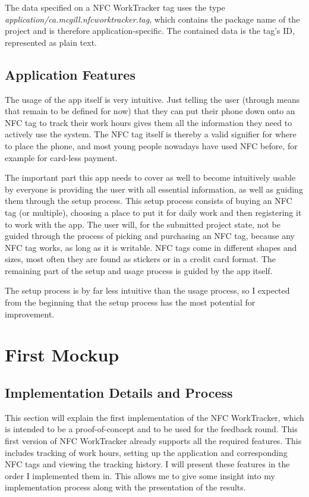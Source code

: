 \documentclass[conference]{IEEEtran}
\newcommand{\projectname}{NFC WorkTracker}
\begin{document}
The data specified on a \projectname{} tag uses the type \textit{application/ca.mcgill.nfcworktracker.tag}, which contains the package name of the project and is therefore application-specific. The contained data is the tag's ID, represented as plain text.

\subsection{Application Features}
The usage of the app itself is very intuitive. Just telling the user (through means that remain to be defined for now) that they can put their phone down onto an NFC tag to track their work hours gives them all the information they need to actively use the system. The NFC tag itself is thereby a valid signifier for where to place the phone, and most young people nowadays have used NFC before, for example for card-less payment.

The important part this app needs to cover as well to become intuitively usable by everyone is providing the user with all essential information, as well as guiding them through the setup process. This setup process consists of buying an NFC tag (or multiple), choosing a place to put it for daily work and then registering it to work with the app.
The user will, for the submitted project state, not be guided through the process of picking and purchasing an NFC tag, because any NFC tag works, as long as it is writable. NFC tags come in different shapes and sizes, most often they are found as stickers or in a credit card format. The remaining part of the setup and usage process is guided by the app itself.

The setup process is by far less intuitive than the usage process, so I expected from the beginning that the setup process has the most potential for improvement.

\section{First Mockup}
\subsection{Implementation Details and Process}
This section will explain the first implementation of the \projectname{}, which is intended to be a proof-of-concept and to be used for the feedback round. This first version of \projectname{} already supports all the required features. This includes tracking of work hours, setting up the application and corresponding NFC tags and viewing the tracking history. I will present these features in the order I implemented them in. This allows me to give some insight into my implementation process along with the presentation of the results.
\end{document}

